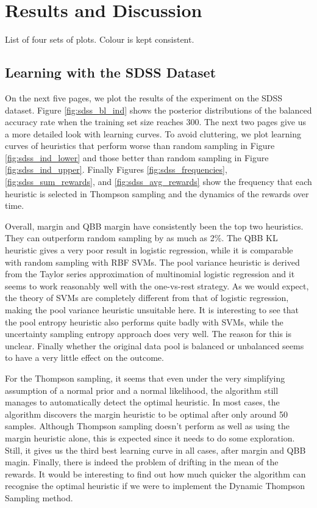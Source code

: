 \section{Results and Discussion}
\label{sec:results2}

List of four sets of plots. Colour is kept consistent.

\subsection{Learning with the SDSS Dataset}

On the next five pages, we plot the results of the experiment on the SDSS dataset.
Figure \ref{fig:sdss_bl_ind} shows the posterior distributions of the
balanced accuracy rate when the training set size reaches 300. The next two pages give us
a more detailed look with learning curves. To avoid cluttering, we plot learning curves
of heuristics that perform worse than random sampling in Figure \ref{fig:sdss_ind_lower}
and those better than random sampling in Figure \ref{fig:sdss_ind_upper}. Finally
Figures \ref{fig:sdss_frequencies}, \ref{fig:sdss_sum_rewards}, and
\ref{fig:sdss_avg_rewards} show the frequency that each heuristic is selected in Thompson
sampling and the dynamics of the rewards over time.

Overall, margin and QBB margin have consistently been the top two heuristics. They can
outperform random sampling by as much as 2\%. The QBB KL heuristic gives a very poor result
in logistic regression, while it is comparable with random sampling with RBF SVMs.
The pool variance heuristic is derived from the Taylor series approximation
of multinomial logistic regression and it seems to work reasonably well with the one-vs-rest
strategy. As we would expect, the theory of SVMs are completely different from that of logistic
regression, making the pool variance heuristic unsuitable here. It is interesting
to see that the pool entropy heuristic also performs quite badly with SVMs, while
the uncertainty sampling entropy approach does very well. The reason for this is unclear.
Finally whether the original data pool is balanced or unbalanced seems to have a very little effect
on the outcome.

For the Thompson sampling, it seems that even under the very simplifying assumption 
of a normal prior and a normal likelihood, the algorithm still manages to automatically detect
the optimal heuristic. In most cases, the algorithm discovers the margin heuristic to
be optimal after only around 50 samples. Although Thompson sampling doesn't perform as well
as using the margin heuristic alone, this is expected since it needs to do some exploration.
Still, it gives us the third best learning curve in all cases, after margin and QBB magin.
Finally, there is indeed the problem of drifting in the mean of the rewards. It would be
interesting to find out how much quicker the algorithm can recognise the optimal heuristic
if we were to implement the Dynamic Thompson Sampling method.


